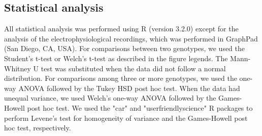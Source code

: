 \subsection*{Statistical analysis}

All statistical analysis was performed using R (version 3.2.0)\cite{R} except for the analysis of the electrophysiological recordings, which was performed in GraphPad (San Diego, CA, USA).
For comparisons between two genotypes, we used the Student's t-test or Welch's t-test as described in the figure legends.
The Mann-Whitney U test was substituted when the data did not follow a normal distribution.
For comparisons among three or more genotypes, we used the one-way ANOVA followed by the Tukey HSD post hoc test. 
When the data had unequal variance, we used Welch's one-way ANOVA followed by the Games-Howell post hoc test.
We used the "car"\cite{car} and "userfriendlyscience"\cite{user} R packages to perform Levene's test for homogeneity of variance and the Games-Howell post hoc test, respectively.
  